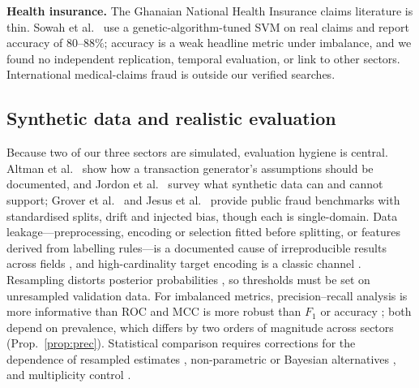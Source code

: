 \documentclass[journal]{IEEEtran}
\newcommand{\1}{\mathbf{1}}
\begin{document}
\textbf{Health insurance.} The Ghanaian National Health Insurance claims literature is thin. Sowah et al.\ \cite{sowah2019dss} use a genetic-algorithm-tuned SVM on real claims and report accuracy of $80$--$88\%$; accuracy is a weak headline metric under imbalance, and we found no independent replication, temporal evaluation, or link to other sectors. International medical-claims fraud is outside our verified searches.

\subsection{Synthetic data and realistic evaluation}
Because two of our three sectors are simulated, evaluation hygiene is central. Altman et al.\ \cite{altman2023realistic} show how a transaction generator's assumptions should be documented, and Jordon et al.\ \cite{jordon2022synthetic} survey what synthetic data can and cannot support; Grover et al.\ \cite{grover2022fdb} and Jesus et al.\ \cite{jesus2022turning} provide public fraud benchmarks with standardised splits, drift and injected bias, though each is single-domain. Data leakage---preprocessing, encoding or selection fitted before splitting, or features derived from labelling rules---is a documented cause of irreproducible results across fields \cite{kapoor2023leakage,kaufman2012leakage}, and high-cardinality target encoding is a classic channel \cite{micci2001target}. Resampling distorts posterior probabilities \cite{chawla2002smote,dalpozzolo2015calibrating}, so thresholds must be set on unresampled validation data. For imbalanced metrics, precision--recall analysis is more informative than ROC \cite{saito2015pr} and MCC is more robust than $F_1$ or accuracy \cite{chicco2020mcc}; both depend on prevalence, which differs by two orders of magnitude across sectors (Prop.~\ref{prop:prec}). Statistical comparison requires corrections for the dependence of resampled estimates \cite{nadeau2003inference}, non-parametric or Bayesian alternatives \cite{demsar2006statistical,benavoli2017time}, and multiplicity control \cite{holm1979simple}.
\end{document}
